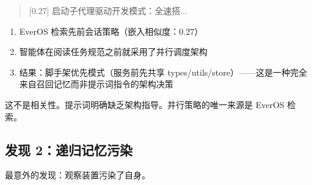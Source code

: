 \documentclass[11pt, a4paper]{article}
\begin{document}
\begin{quote}
\ttfamily\small\color{deep}
[0.27] 启动子代理驱动开发模式：全速搭...
\end{quote}

\begin{keyfinding}
\begin{enumerate}
  \item EverOS 检索先前会话策略（嵌入相似度：0.27）
  \item 智能体在阅读任务规范之前就采用了并行调度架构
  \item 结果：脚手架优先模式（服务前先共享 types/utils/store）——这是一种完全来自召回记忆而非提示词指令的架构决策
\end{enumerate}
这不是相关性。提示词明确缺乏架构指导。并行策略的唯一来源是 EverOS 检索。
\end{keyfinding}

\subsection{发现 2：递归记忆污染}

最意外的发现：观察装置污染了自身。
\end{document}
